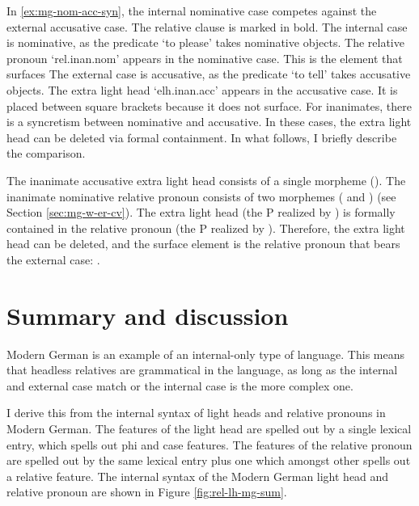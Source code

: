 In \ref{ex:mg-nom-acc-syn}, the internal nominative case competes against the external accusative case. The relative clause is marked in bold.
The internal case is nominative, as the predicate  `to please' takes nominative objects. The relative pronoun  `\ac{rel}.\ac{inan}.\ac{nom}' appears in the nominative case. This is the element that surfaces
The external case is accusative, as the predicate  `to tell' takes accusative objects. The extra light head  `\ac{elh}.\ac{inan}.\ac{acc}' appears in the accusative case. It is placed between square brackets because it does not surface.
For inanimates, there is a syncretism between nominative and accusative. In these cases, the extra light head can be deleted via formal containment. In what follows, I briefly describe the comparison.

The inanimate accusative extra light head consists of a single morpheme (). The inanimate nominative relative pronoun consists of two morphemes ( and ) (see Section \ref{sec:mg-w-er-cv}).
The extra light head (the P realized by ) is formally contained in the relative pronoun (the P realized by ).
Therefore, the extra light head can be deleted, and the surface element is the relative pronoun that bears the external case: .


\section{Summary and discussion}

Modern German is an example of an internal-only type of language. This means that headless relatives are grammatical in the language, as long as the internal and external case match or the internal case is the more complex one.

I derive this from the internal syntax of light heads and relative pronouns in Modern German. The features of the light head are spelled out by a single lexical entry, which spells out phi and case features. The features of the relative pronoun are spelled out by the same lexical entry plus one which amongst other spells out a relative feature. The internal syntax of the Modern German light head and relative pronoun are shown in Figure \ref{fig:rel-lh-mg-sum}.

